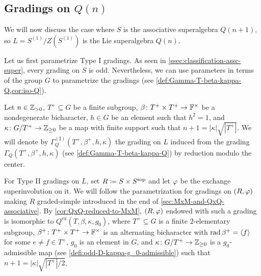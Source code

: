 \subsection{Gradings on \texorpdfstring{$Q(n)$}{Q(n)}}\label{ssec:grds-on-Q(n)}

We will now discuss the case where $S$ is the associative superalgebra $Q(n+1)$, so $L = S^{(1)}/Z(S^{(1)})$ is the Lie superalgebra $Q(n)$. 

Let us first parametrize Type I gradings. 
As seen in \cref{ssec:classification-assc-super}, every grading on $S$ is odd. 
Nevertheless, we can use parameters in terms of the group $G$ to parametrize the gradings (see \cref{def:Gamma-T-beta-kappa-Q,cor:iso-Q}).  

\begin{defi}\label{def:Q-Type-I}
    Let $n \in \mathbb{Z}_{> 0}$, $T^+ \subseteq G$ be a finite subgroup, $\beta\colon T^+ \times T^+ \to \mathbb{F}^\times$ be a nondegenerate bicharacter, $h\in G$ be an element such that $h^2 = 1$, and $\kappa\colon G/T^+ \to \mathbb{Z}_{\geq 0}$ be a map with finite support such that $n + 1 = |\kappa| \sqrt{|T^+|}$. 
    We will denote by $\Gamma^{\mathrm{(I)}}_Q(T^+, \beta^+, h, \kappa)$ the grading on $L$ induced from the grading $\Gamma_Q (T^+, \beta^+, h, \kappa)$ (see \cref{def:Gamma-T-beta-kappa-Q}) by reduction modulo the center. 
\end{defi}

For Type II gradings on $L$,
set $R \coloneqq S\times S^{\mathrm{sop}}$ and let $\varphi$ be the exchange superinvolution on it. 
We will follow the parametrization for gradings on $(R, \varphi)$ making $R$ graded-simple introduced in the end of \cref{sec:MxM-and-QxQ-associative}. 
By  \cref{cor:QxQ-reduced-to-MxM}, $(R, \varphi)$ endowed with such a grading is isomorphic to $Q^{\mathrm{ex}} (T, \beta, \kappa, g_0)$, where $T^+ \subseteq G$ is a finite $2$-elementary subgroup, $\beta^+\colon T^+\times T^+ \to \mathbb{F}^\times$ is an alternating bicharacter with $\operatorname{rad} \beta^+ = \langle f \rangle$ for some $e\neq f \in T^+$, $g_0$ is an element in $G$, and $\kappa\colon G/T^+ \to \mathbb{Z}_{\geq 0}$ is a $g_0$-admissible map (see \cref{defi:odd-D-kappa-g_0-admissible}) such that $n+1 = |\kappa| \sqrt{|T^+|/2}$. 

